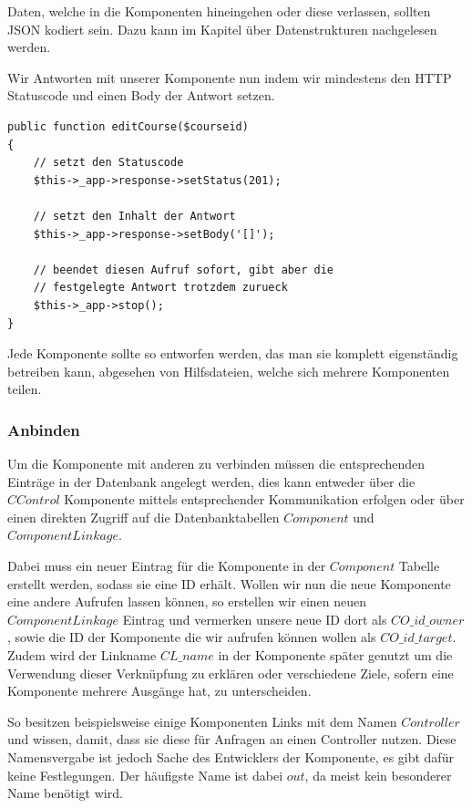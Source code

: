 \documentclass[10pt,a4paper,final,parskip]{scrartcl}
\begin{document}
Daten, welche in die Komponenten hineingehen oder diese verlassen, sollten JSON kodiert sein. Dazu kann im Kapitel über Datenstrukturen nachgelesen werden.

Wir Antworten mit unserer Komponente nun indem wir mindestens den HTTP Statuscode und einen Body der Antwort setzen.

\begin{minipage}{\textwidth}
\begin{lstlisting}
public function editCourse($courseid)
{
    // setzt den Statuscode
    $this->_app->response->setStatus(201);

    // setzt den Inhalt der Antwort
    $this->_app->response->setBody('[]');
    
    // beendet diesen Aufruf sofort, gibt aber die 
    // festgelegte Antwort trotzdem zurueck
    $this->_app->stop();
}
\end{lstlisting}
\end{minipage}

Jede Komponente sollte so entworfen werden, das man sie komplett eigenständig betreiben kann, abgesehen von Hilfsdateien, welche sich mehrere Komponenten teilen.


 
 \subsubsection{Anbinden}
 Um die Komponente mit anderen zu verbinden müssen die entsprechenden Einträge in der Datenbank angelegt werden, dies kann entweder über die $CControl$ Komponente mittels entsprechender Kommunikation erfolgen oder über einen direkten Zugriff auf die Datenbanktabellen $Component$ und $ComponentLinkage$. 
 
Dabei muss ein neuer Eintrag für die Komponente in der $Component$ Tabelle erstellt werden, sodass sie eine ID erhält. Wollen wir nun die neue Komponente eine andere Aufrufen lassen können, so erstellen wir einen neuen $ComponentLinkage$ Eintrag und vermerken unsere neue ID dort als $CO\_id\_owner$, sowie die ID der Komponente die wir aufrufen können wollen als $CO\_id\_target$. Zudem wird der Linkname $CL\_name$ in der Komponente später genutzt um die Verwendung dieser Verknüpfung zu erklären oder verschiedene Ziele, sofern eine Komponente mehrere Ausgänge hat, zu unterscheiden.

So besitzen beispielsweise einige Komponenten Links mit dem Namen $Controller$ und wissen, damit, dass sie diese für Anfragen an einen Controller nutzen. Diese Namensvergabe ist jedoch Sache des Entwicklers der Komponente, es gibt dafür keine Festlegungen. Der häufigste Name ist dabei $out$, da meist kein besonderer Name benötigt wird.
 
\end{document}
